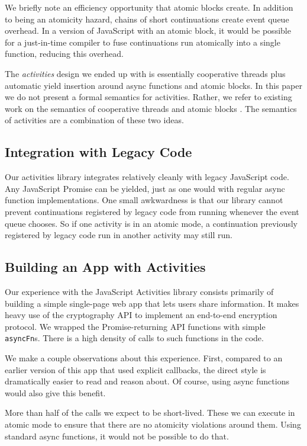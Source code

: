 \documentclass[acmsmall,anonymous,review]{acmart}\settopmatter{printfolios=true,printccs=false,printacmref=false}
\begin{document}
We briefly note an efficiency opportunity that atomic blocks create.
In addition to being an atomicity hazard, chains of short continuations create event queue overhead.
In a version of JavaScript with an atomic block, it would be possible for a just-in-time compiler to fuse continuations run atomically into a single function, reducing this overhead.

The \emph{activities} design we ended up with is essentially cooperative threads plus automatic yield insertion around async functions and atomic blocks.
In this paper we do not present a formal semantics for activities.
Rather, we refer to existing work on the semantics of cooperative threads \cite{Abadi2009} and atomic blocks \cite{Moore2008}.
The semantics of activities are a combination of these two ideas.

\subsection{Integration with Legacy Code}

Our activities library integrates relatively cleanly with legacy JavaScript code.
Any JavaScript Promise can be yielded, just as one would with regular async function implementations.
One small awkwardness is that our library cannot prevent continuations registered by legacy code from running whenever the event queue chooses.
So if one activity is in an atomic mode, a continuation previously registered by legacy code run in another activity may still run.

\subsection{Building an App with Activities}

Our experience with the JavaScript Activities library consists primarily of building a simple single-page web app that lets users share information.
It makes heavy use of the cryptography API to implement an end-to-end encryption protocol.
We wrapped the Promise-returning API functions with simple \texttt{asyncFn}s.
There is a high density of calls to such functions in the code.

We make a couple observations about this experience.
First, compared to an earlier version of this app that used explicit callbacks, the direct style is dramatically easier to read and reason about.
Of course, using async functions would also give this benefit.

More than half of the calls we expect to be short-lived.
These we can execute in atomic mode to ensure that there are no atomicity violations around them.
Using standard async functions, it would not be possible to do that.
\end{document}
